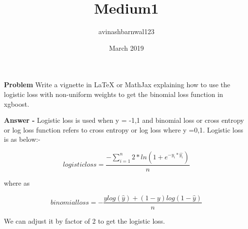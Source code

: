 \documentclass{article}
\title{Medium1}
\author{avinashbarnwal123 }
\date{March 2019}
\begin{document}
\maketitle

\begin{flushleft}

\textbf{Problem} Write a vignette in LaTeX or MathJax explaining how to use the logistic loss with non-uniform weights to get the binomial loss function in xgboost.

\textbf{Answer -} Logistic loss is used when y = {-1,1} and binomial loss or cross entropy or log loss function refers to cross entropy or log loss where y ={0,1}. Logistic loss is as below:-

\begin{equation}
logistic loss = \frac{-\sum_{i=1}^n2*ln(1+e^{-y_i*\hat{y_i}})}{n}   
\end{equation}

where as

\begin{equation}
binomial loss = -\frac{ylog(\hat{y})+(1-y)log(1-\hat{y})}{n}    
\end{equation}

We can adjust it by factor of 2 to get the logistic loss.
\end{flushleft}
\end{document}
